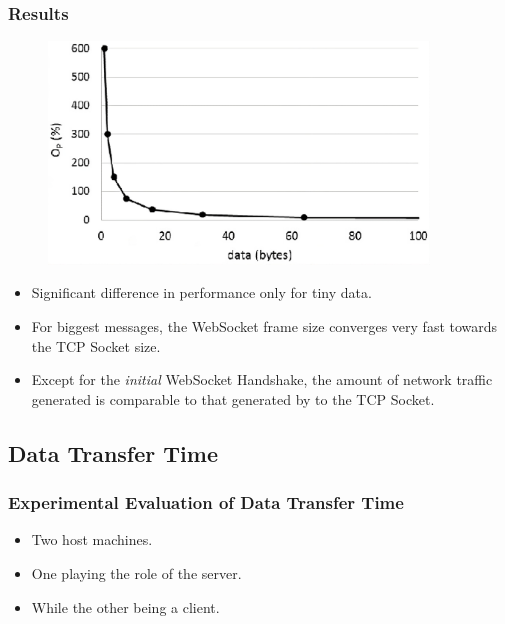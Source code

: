\documentclass{beamer}
\begin{document}
\begin{frame}
    \frametitle{Results}
    \begin{figure}
        \includegraphics[width=0.9\textwidth]{images/network_traffic_overhead.jpeg}
    \end{figure}
    \pause{}
    \begin{itemize}[<+->]
        \item \alert{Significant difference} in performance only for \alert{tiny data}.
        \item For \alert{biggest messages}, the WebSocket frame size \alert{converges very
                  fast} towards the TCP Socket size. 
        \item Except for the \textit{initial} WebSocket Handshake, \alert{the amount of
                  network traffic generated is comparable to that generated by to the TCP Socket.
                   }
    \end{itemize}
\end{frame}

\subsection{Data Transfer Time}
\begin{frame}
    \frametitle{Experimental Evaluation of Data Transfer Time}
    \begin{itemize}[<+->]
        \item Two host machines.
        \item One playing the role of the server.
        \item While the other being a client.
    \end{itemize}
\end{frame}
\end{document}
